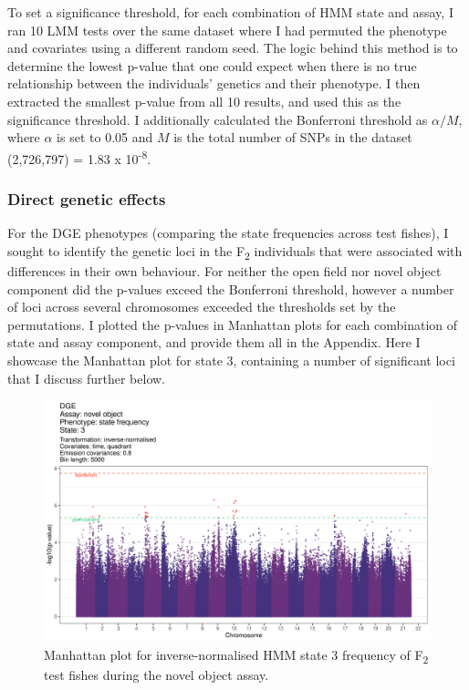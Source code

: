 \documentclass[
]{book}
\begin{document}
To set a significance threshold, for each combination of HMM state and assay, I ran 10 LMM tests over the same dataset where I had permuted the phenotype and covariates using a different random seed. The logic behind this method is to determine the lowest p-value that one could expect when there is no true relationship between the individuals' genetics and their phenotype. I then extracted the smallest p-value from all 10 results, and used this as the significance threshold. I additionally calculated the Bonferroni threshold as \(\alpha / M\), where \(\alpha\) is set to 0.05 and \(M\) is the total number of SNPs in the dataset (2,726,797) = 1.83 x 10\textsuperscript{-8}.

\hypertarget{direct-genetic-effects-2}{%
\subsubsection{Direct genetic effects}\label{direct-genetic-effects-2}}

For the DGE phenotypes (comparing the state frequencies across test fishes), I sought to identify the genetic loci in the F\textsubscript{2} individuals that were associated with differences in their own behaviour. For neither the open field nor novel object component did the p-values exceed the Bonferroni threshold, however a number of loci across several chromosomes exceeded the thresholds set by the permutations. I plotted the p-values in Manhattan plots for each combination of state and assay component, and provide them all in the Appendix. Here I showcase the Manhattan plot for state 3, containing a number of significant loci that I discuss further below.



\begin{figure}
\includegraphics[width=1\linewidth]{figs/mikk_behaviour/manhattans/dge_no_3_time-quadrant} \caption{Manhattan plot for inverse-normalised HMM state 3 frequency of F\textsubscript{2} test fishes during the novel object assay.}\label{fig:F2-man-dge-no-3}
\end{figure}
\end{document}
